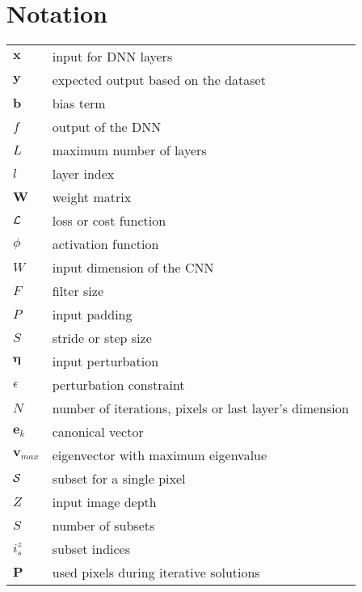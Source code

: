 \chapter*{Notation}

{\renewcommand{\arraystretch}{1.5}
\begin{longtabu}{l X}
$\bm{x}$ & input for DNN layers \\
$\bm{y}$ & expected output based on the dataset \\
$\bm{b}$ & bias term \\
$f$ & output of the DNN \\
$L$ & maximum number of layers \\
$l$ & layer index \\
$\bm{W}$ & weight matrix \\
$\mathcal{L}$ & loss or cost function \\
$\phi$ & activation function \\
$W$ & input dimension of the CNN \\
$F$ & filter size \\
$P$ & input padding \\
$S$ & stride or step size \\
$\bm{\eta}$ & input perturbation \\
$\epsilon$ & perturbation constraint \\
$N$ & number of iterations, pixels or last layer's dimension \\
$\bm{e}_k$ & canonical vector \\
$\bm{v}_{max}$ & eigenvector with maximum eigenvalue \\
$\mathcal{S}$ & subset for a single pixel \\
$Z$ & input image depth \\
$S$ & number of subsets \\
$i_s^z$ & subset indices \\
$\bm{P}$ & used pixels during iterative solutions \\
\end{longtabu}
}
